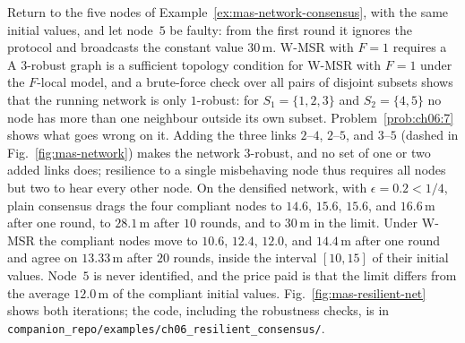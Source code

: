\documentclass[graybox,envcountchap]{style/SNmono}
\newcommand{\repopath}[1]{\texttt{#1}}
\providecommand{\DIFadd}[1]{{\protect\color{blue} #1}} %
\providecommand{\DIFdel}[1]{{\protect\color{red} #1}} %
\providecommand{\DIFaddbegin}{} %
\providecommand{\DIFaddend}{} %
\providecommand{\DIFdelbegin}{} %
\providecommand{\DIFdelend}{} %
\begin{document}
\begin{example}
\label{ex:mas-resilient-net}
Return to the five nodes of Example~\ref{ex:mas-network-consensus}, with the same initial values, and let node~$5$ be faulty: from the first round it ignores the protocol and broadcasts the constant value $30$\,m. \DIFdelbegin \DIFdel{W-MSR with $F=1$ requires a }\DIFdelend \DIFaddbegin \DIFadd{A }\DIFaddend $3$-robust graph \DIFaddbegin \DIFadd{is a sufficient topology condition for W-MSR with $F=1$ under the $F$-local model}\DIFaddend , and a brute-force check over all pairs of disjoint subsets shows that the running network is only $1$-robust: for $S_1=\{1,2,3\}$ and $S_2=\{4,5\}$ no node has more than one neighbour outside its own subset. Problem~\ref{prob:ch06:7} shows what goes wrong on it. Adding the three links $2$--$4$, $2$--$5$, and $3$--$5$ (dashed in Fig.~\ref{fig:mas-network}) makes the network $3$-robust, and no set of one or two added links does; resilience to a single misbehaving node thus requires all nodes but two to hear every other node. On the densified network, with $\epsilon=0.2<1/4$, plain consensus drags the four compliant nodes to $14.6$, $15.6$, $15.6$, and $16.6$\,m after one round, to $28.1$\,m after $10$ rounds, and to $30$\,m in the limit. Under W-MSR the compliant nodes move to $10.6$, $12.4$, $12.0$, and $14.4$\,m after one round and agree on $13.33$\,m after $20$ rounds, inside the interval $[10,15]$ of their initial values. Node~$5$ is never identified, and the price paid is that the limit differs from the average $12.0$\,m of the compliant initial values. Fig.~\ref{fig:mas-resilient-net} shows both iterations; the code, including the robustness checks, is in \repopath{companion\_\allowbreak repo/\allowbreak examples/\allowbreak ch06\_\allowbreak resilient\_\allowbreak consensus/\allowbreak }.
\end{example}
\end{document}
